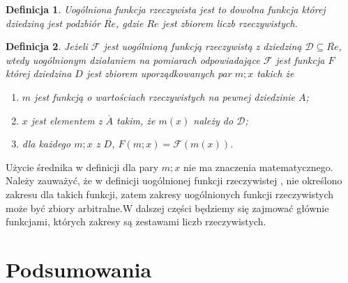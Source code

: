 \documentclass[12pt,a4paper]{report}
\newtheorem{definition}{Definicja}[chapter]
\begin{document}
\begin{definition}
Uogólniona funkcja rzeczywista jest to dowolna funkcja której dziedziną jest podzbiór $\overline{Re}$, gdzie $Re$ jest zbiorem liczb rzeczywistych.
\end{definition}
\begin{definition}
Jeżeli $\mathcal{F}$ jest uogólnioną funkcją rzeczywistą z dziedziną $\mathcal{D}\subseteq\overline{Re}$, wtedy uogólnionym działaniem na pomiarach odpowiadające $\mathcal{F}$ jest funkcja $F$ której dziedzina $D$ jest zbiorem uporządkowanych par $m;x$ takich że
\begin{enumerate}
\item
$m$ jest funkcją o wartościach rzeczywistych na pewnej dziedzinie $A$;
\item
$x$ jest elementem z $\overline{A}$ takim, że $m(x)$ należy do $\mathcal{D}$;
\item
dla każdego $m;x$ z $D$, $F(m;x)=\mathcal{F}(m(x))$.
\end{enumerate}

\end{definition}
Użycie średnika w definicji dla pary $m;x$ nie ma znaczenia matematycznego. Należy zauważyć, że w definicji uogólnionej funkcji rzeczywistej , nie określono zakresu dla takich funkcji, zatem zakresy uogólnionych funkcji rzeczywistych może być zbiory arbitralne.W dalszej części będziemy się zajmować głównie funkcjami, których zakresy są zestawami liczb rzeczywistych. 


\chapter{Podsumowania}



\end{document}
